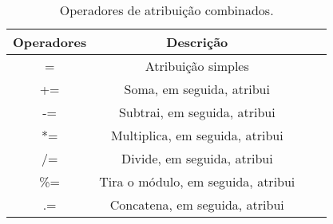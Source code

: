 \begin{table}[h]
\caption{Operadores de atribuição combinados.}\label{tab:cap4-operadores-combinados}
\begin{center}
\begin{tabular}{|c|c|c|c|}
\hline
  \multicolumn{1}{|c|}{ \textbf{Operadores}}
&  \multicolumn{1}{|c|}{ \textbf{Descrição}} \\
\hline
\hline
=             & Atribuição simples   \\ \hline
+=             & Soma, em seguida, atribui   \\ \hline
-=             & Subtrai, em seguida, atribui   \\ \hline
*=             & Multiplica, em seguida, atribui   \\ \hline
/=  & Divide, em seguida, atribui   \\ \hline
\%=             & Tira o módulo, em seguida, atribui   \\ \hline
.=             & Concatena, em seguida, atribui   \\ \hline
\end{tabular}
\end{center}
\end{table}
